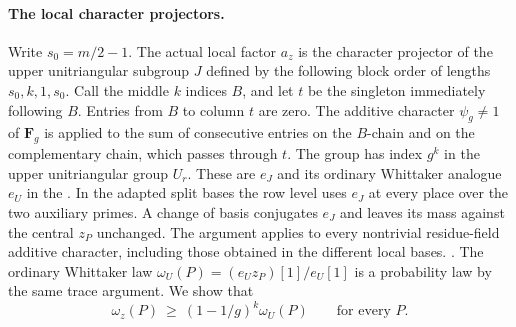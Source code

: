 \paragraph{The local character projectors.}
Write \(s_0=m/2-1\). The actual local factor \(a_z\) is the
character projector of the upper unitriangular subgroup \(J\)
defined by the following block order of lengths \(s_0,k,1,s_0\).
Call the middle \(k\) indices \(B\), and let \(t\) be the singleton
immediately following \(B\). Entries from \(B\) to column \(t\) are
zero. The additive character \(\psi_g\ne1\) of \(\mathbf F_g\)
is applied to the sum of consecutive entries on the \(B\)-chain and
on the complementary chain, which passes through \(t\).
The group has index \(g^k\) in the upper unitriangular group \(U_r\).
These are \(e_J\) and its ordinary Whittaker analogue \(e_U\) in the
.
In the adapted split bases the row level uses \(e_J\) at every
place over the two auxiliary primes. A change of basis conjugates
\(e_J\) and leaves its mass against the central \(z_P\) unchanged.
The argument applies to every nontrivial residue-field additive
character, including those obtained in the different local bases.
.
The ordinary Whittaker law \(\omega_U(P)=(e_U z_P)[1]/e_U[1]\)
is a probability law by the same trace argument. We show that
\begin{equation}
\label{eq:trace-finite-mass-comparison}
  \omega_z(P)\ \ge\ (1-1/g)^k\omega_U(P)\qquad\text{for every }P .
\end{equation}

